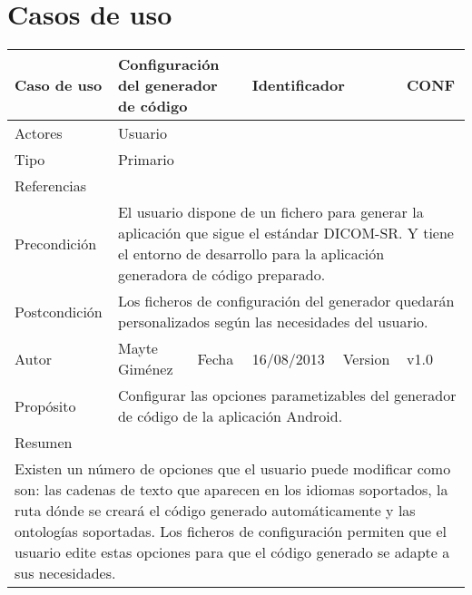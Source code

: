 \section{Casos de uso}\label{sec:casos-uso}
\renewcommand*{\arraystretch}{1.5}
\begin{center}
  \begin{longtable}{ |b{2.5cm}|b{4cm}|b{1cm}|b{2cm}|b{1.5cm}| b{2.5cm}| }
  
    \hline
    \cellcolor{RubineRed} {\color{White} Caso de uso} & \multicolumn{2}{|l|}{\parbox{4.5cm}{Configuración del generador de código}}  & \multicolumn{2}{|l|}{\color{RubineRed} Identificador}  &  CONF \\ 
    \hline \hline
    {\color{RubineRed} Actores } & \multicolumn{5}{|l|}{Usuario}  \\ 
    \hline
    {\color{RubineRed} Tipo } & \multicolumn{5}{|l|}{Primario}  \\ 
    \hline
    {\color{RubineRed} Referencias } & \multicolumn{5}{|l|}{}  \\ 
    \hline
    {\color{RubineRed} Precondición } & \multicolumn{5}{|l|}{\parbox{13cm}{El usuario dispone de un fichero para generar la aplicación que sigue el estándar DICOM-SR. Y tiene el entorno de desarrollo para la aplicación generadora de código preparado.} }  \\ 
    \hline
    {\color{RubineRed} Postcondición } & \multicolumn{5}{|l|}{\parbox{13cm}{Los ficheros de configuración del generador quedarán personalizados según las necesidades del usuario.}}  \\ 
    \hline
    {\color{RubineRed} Autor } &  Mayte Giménez & {\color{RubineRed} Fecha } & 16/08/2013 & {\color{RubineRed} Version } & v1.0 \\ 
    \hline
    {\color{RubineRed} Propósito } & \multicolumn{5}{|l|}{\parbox{13cm}{Configurar las opciones parametizables del generador de código de la aplicación Android.}}  \\ 
    \hline
    \multicolumn{6}{|l|}{{\color{RubineRed} Resumen }}  \\ 
    \hline
   	\multicolumn{6}{|l|}{\parbox{16cm}{ Existen un número de opciones que el usuario puede modificar como son: las cadenas de texto que aparecen en los idiomas soportados, la ruta dónde se creará el código generado automáticamente y las ontologías soportadas. Los ficheros de configuración permiten que el usuario edite estas opciones para que el código generado se adapte a sus necesidades.}}  \\ 

\end{longtable}
\end{center}
